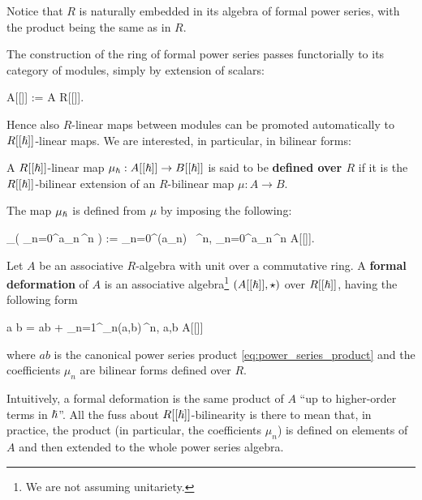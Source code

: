 \documentclass[main.tex]{subfiles}
\begin{document}
Notice that $R$ is naturally embedded in its algebra of formal power series, with the product being the same as in $R$.

The construction of the ring of formal power series passes functorially to its category of modules, simply by extension of scalars:
\begin{eqalign}
	A[[\planck]] := A \tens[R] R[[\planck]].
\end{eqalign}
Hence also $R$-linear maps between modules can be promoted automatically to $R[[{\boldsymbol\hslash}]]$-linear maps. We are interested, in particular, in bilinear forms:

\begin{definition}
	A $R[[{\boldsymbol\hslash}]]$-linear map $\mu_\hbar : A[[{\boldsymbol\hslash}]] \to B[[{\boldsymbol\hslash}]]$ is said to be \textbf{defined over $R$} if it is the $R[[{\boldsymbol\hslash}]]$-bilinear extension of an $R$-bilinear map $\mu : A \to B$.
\end{definition}

The map $\mu_{\boldsymbol\hslash}$ is defined from $\mu$ by imposing the following:
\begin{eqalign}
	\mu_\planck\left( \sum_{n=0}^\infty a_n\,\planck^n \right) := \sum_{n=0}^\infty \mu(a_n) \, \planck^n, \quad \forall \sum_{n=0}^\infty a_n\,\planck^n \in A[[\planck]].
\end{eqalign}

\begin{definition}
	Let $A$ be an associative $R$-algebra with unit over a commutative ring. A \textbf{formal deformation} of $A$ is an associative algebra\footnote{We are not assuming unitariety.} $(A[[{\boldsymbol\hslash}]], \star)$ over $R[[{\boldsymbol\hslash}]]$, having the following form
	\begin{eqalign}
		a \star b = ab + \sum_{n=1}^\infty \mu_n(a,b)\,\planck^n, \quad \forall a,b \in A[[\planck]]
	\end{eqalign}
	where $ab$ is the canonical power series product \eqref{eq:power_series_product} and the coefficients $\mu_n$ are bilinear forms defined over $R$.
\end{definition}

\begin{remark}
	Intuitively, a formal deformation is the same product of $A$ ``up to higher-order terms in ${\boldsymbol\hslash}$''. All the fuss about $R[[{\boldsymbol\hslash}]]$-bilinearity is there to mean that, in practice, the product (in particular, the coefficients $\mu_n$) is defined on elements of $A$ and then extended to the whole power series algebra.
\end{remark}
\end{document}

